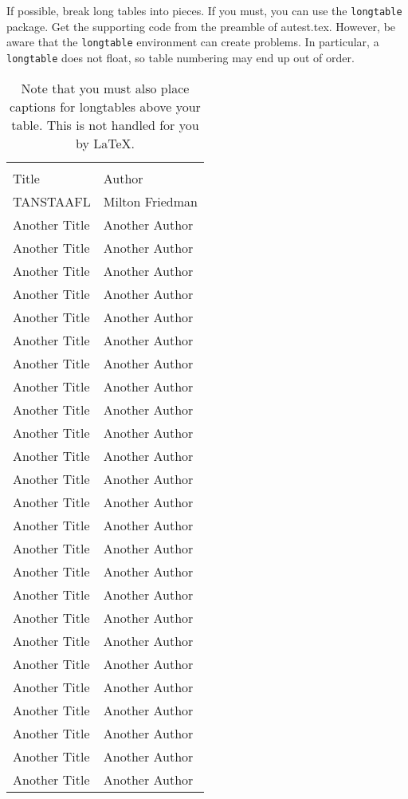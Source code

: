 \documentclass[12pt,econ]{sources/authesis}
\theoremstyle{definition}
\theoremstyle{definition}
\theoremstyle{definition}
\theoremstyle{remark}
\begin{document}
If possible, break long tables into pieces. If you must, you can use the
\texttt{longtable} package. Get the supporting code from the preamble of
autest.tex. However, be aware that the \texttt{longtable} environment
can create problems. In particular, a \texttt{longtable} does not float,
so table numbering may end up out of order.
\begin{center}
\begin{longtable}{ll}\hline\hline
\caption{Note that you must also place captions for longtables above your table.
This is not handled for you by \LaTeX.}
\\
Title & Author \\ \hline
TANSTAAFL & Milton Friedman \\
Another Title & Another Author \\
Another Title & Another Author \\
Another Title & Another Author \\
Another Title & Another Author \\
Another Title & Another Author \\
Another Title & Another Author \\
Another Title & Another Author \\
Another Title & Another Author \\
Another Title & Another Author \\
Another Title & Another Author \\
Another Title & Another Author \\
Another Title & Another Author \\
Another Title & Another Author \\
Another Title & Another Author \\
Another Title & Another Author \\
Another Title & Another Author \\
Another Title & Another Author \\
Another Title & Another Author \\
Another Title & Another Author \\
Another Title & Another Author \\
Another Title & Another Author \\
Another Title & Another Author \\
Another Title & Another Author \\
Another Title & Another Author \\
Another Title & Another Author \\

\end{longtable}
\end{center}
\end{document}
